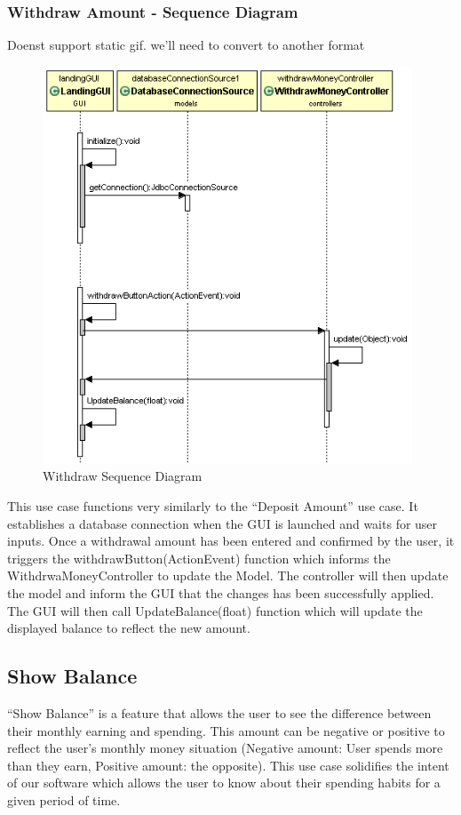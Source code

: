 \documentclass[12pt]{article}
\begin{document}
\subsubsection{Withdraw Amount - Sequence Diagram}
 Doenst support static gif. we'll need to convert to another format
\begin{figure}[h!]
  \centering
  \includegraphics[width=110mm]{withdraw_sequence.png}
  \caption{Withdraw Sequence Diagram}
\end{figure}
\clearpage

This use case functions very similarly to the “Deposit Amount” use case. It establishes a database connection when the GUI is launched and waits for user inputs. Once a withdrawal amount has been entered and confirmed by the user, it triggers the withdrawButton(ActionEvent) function which informs the WithdrwaMoneyController to update the Model. The controller will then update the model and inform the GUI that the changes has been successfully applied. The GUI will then call UpdateBalance(float) function which will update the displayed balance to reflect the new amount.

\subsection{Show Balance} 
“Show Balance” is a feature that allows the user to see the difference between their monthly earning and spending. This amount can be negative or positive to reflect the user’s monthly money situation (Negative amount: User spends more than they earn, Positive amount: the opposite). This use case solidifies the intent of our software which allows the user to know about their spending habits for a given period of time.
\end{document}
